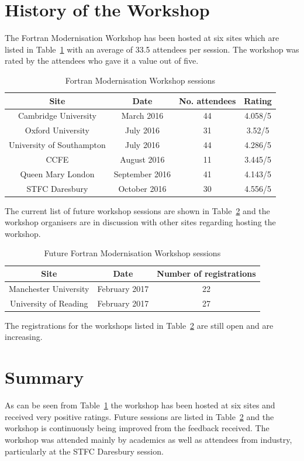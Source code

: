 \documentclass[12pt]{article}
\begin{document}
\section{History of the Workshop}
The Fortran Modernisation Workshop has been hosted at six sites which are listed in Table~\ref{fmw:sites} with an
average of 33.5 attendees per session. The workshop was rated by the attendees who gave it a value out of five. 
\begin{table}[H]
\centering 
\begin{tabular}{|c|c|c|c|}
\hline
{\bf Site} & {\bf Date} & {\bf No. attendees} & {\bf Rating} \\ \hline
Cambridge University & March 2016 & 44 & 4.058/5 \\ \hline
Oxford University & July 2016 & 31 & 3.52/5 \\ \hline 
University of Southampton & July 2016 & 44 & 4.286/5 \\ \hline
CCFE & August 2016 & 11 & 3.445/5 \\ \hline
Queen Mary London & September 2016 & 41 & 4.143/5 \\ \hline
STFC Daresbury & October 2016 & 30 & 4.556/5 \\ \hline
\end{tabular}
\caption{Fortran Modernisation Workshop sessions}
\label{fmw:sites}
\end{table}
The current list of future workshop sessions are shown in Table~\ref{fmw:future} and the workshop organisers are in
discussion with other sites regarding hosting the workshop. 
\begin{table}[H]
\centering 
\begin{tabular}{|c|c|c|}
\hline
{\bf Site} & {\bf Date} & {\bf Number of registrations} \\ \hline
Manchester University & February 2017 & 22 \\ \hline
University of Reading & February 2017 & 27 \\ \hline 
\end{tabular}
\caption{Future Fortran Modernisation Workshop sessions}
\label{fmw:future}
\end{table}
The registrations for the workshops listed in Table~\ref{fmw:future} are still open and are increasing. 
\section{Summary}
As can be seen from Table~\ref{fmw:sites} the workshop has been hosted at six sites and received very positive ratings.
Future sessions are listed in Table~\ref{fmw:future} and the workshop is continuously being improved from the feedback received.
The workshop was attended mainly by academics as well as attendees from industry, particularly at the STFC Daresbury session. \\
\end{document}
